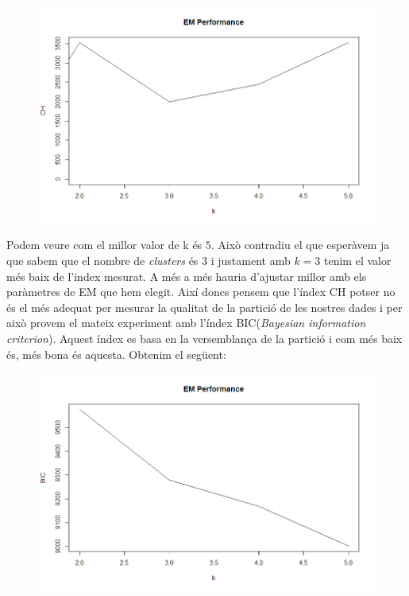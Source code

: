 \documentclass[a4paper]{article}
\begin{document}
\begin{enumerate}
 	\begin{figure}[H]
 		\centering
 		\includegraphics[scale=0.5]{CHPerf}
 	\end{figure}
 
   Podem veure com el millor valor de k és $5$. Això contradiu el que esperàvem ja que sabem que el nombre de \textit{clusters} és 3 i justament amb $k=3$ tenim el valor més baix de l'index mesurat. A més a més hauria d'ajustar millor amb els paràmetres de EM que hem elegit. Així doncs pensem que l'índex CH potser no és el més adequat per mesurar la qualitat de la partició de les nostres dades i per això provem el mateix experiment amb l'índex BIC(\textit{Bayesian information criterion}). Aquest índex es basa en la versemblança de la partició i com més baix és, més bona és aquesta. Obtenim el següent:
   
    \begin{figure}[H]
   	\centering
   	\includegraphics[scale=0.5]{BICPerf}
   \end{figure}


\end{enumerate}
\end{document}
